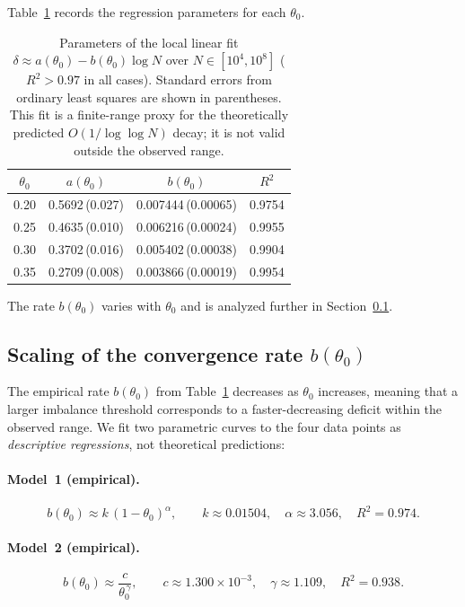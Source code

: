 \documentclass[11pt]{article}
\theoremstyle{definition}
\begin{document}
Table~\ref{tab:fit} records the regression parameters for each \(\theta_0\).

\begin{table}[ht]
\centering
\caption{Parameters of the local linear fit
  \(\delta \approx a(\theta_0) - b(\theta_0)\log N\) over \(N \in [10^4, 10^8]\)
  (\(R^2 > 0.97\) in all cases).  Standard errors from ordinary least squares are
  shown in parentheses.  This fit is a finite-range proxy for the theoretically
  predicted \(O(1/\!\log\log N)\) decay; it is not valid outside the observed range.}
\label{tab:fit}
\begin{tabular}{cccc}
\toprule
\(\theta_0\) & \(a(\theta_0)\) & \(b(\theta_0)\) & \(R^2\) \\
\midrule
0.20 & 0.5692\,(0.027) & 0.007444\,(0.00065) & 0.9754 \\
0.25 & 0.4635\,(0.010) & 0.006216\,(0.00024) & 0.9955 \\
0.30 & 0.3702\,(0.016) & 0.005402\,(0.00038) & 0.9904 \\
0.35 & 0.2709\,(0.008) & 0.003866\,(0.00019) & 0.9954 \\
\bottomrule
\end{tabular}
\end{table}

The rate \(b(\theta_0)\) varies with \(\theta_0\) and is analyzed further in
Section~\ref{sec:bscaling}.

\subsection{Scaling of the convergence rate
  \texorpdfstring{$b(\theta_0)$}{b(theta0)}}
\label{sec:bscaling}

The empirical rate \(b(\theta_0)\) from Table~\ref{tab:fit} decreases as \(\theta_0\)
increases, meaning that a larger imbalance threshold corresponds to a faster-decreasing
deficit within the observed range.  We fit two parametric curves to the four data
points as \emph{descriptive regressions}, not theoretical predictions:

\paragraph{Model~1 (empirical).}
\[
  b(\theta_0) \approx k\,(1-\theta_0)^{\alpha},
  \qquad k \approx 0.01504,\quad \alpha \approx 3.056,\quad R^2 = 0.974.
\]

\paragraph{Model~2 (empirical).}
\[
  b(\theta_0) \approx \frac{c}{\theta_0^{\,\gamma}},
  \qquad c \approx 1.300\times 10^{-3},\quad \gamma \approx 1.109,\quad R^2 = 0.938.
\]
\end{document}
